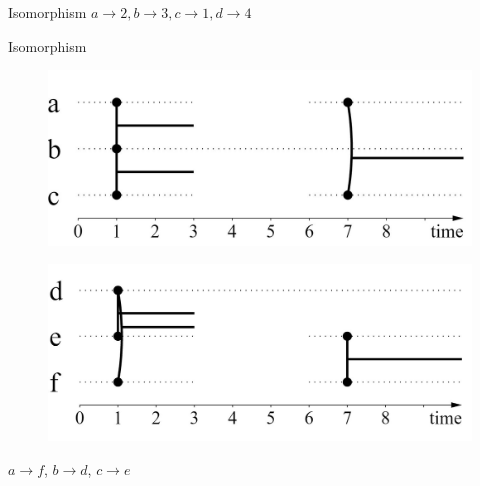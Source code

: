 \documentclass[15pt]{beamer}
\begin{document}
\begin{frame}{Isomorphism}
	\pause
	\centering
	$a \rightarrow 2, b \rightarrow 3, c \rightarrow 1, d \rightarrow 4$
\end{frame}
\begin{frame}{Isomorphism}    
	\begin{minipage}{0.4\linewidth}
		\begin{figure}
			\centering
			\includegraphics[width=\linewidth]{img/iso1.jpg}
			\label{iso1}
		\end{figure}
	\end{minipage}
	\begin{minipage}{0.4\linewidth}
		\begin{figure}
			\centering
			\includegraphics[width=\linewidth]{img/iso2.jpg}
			\label{iso2}
		\end{figure}
	\end{minipage} \pause
	
	$a \rightarrow f $, $b \rightarrow d$, $c \rightarrow e$
    \pause
    

\end{frame}
\end{document}
